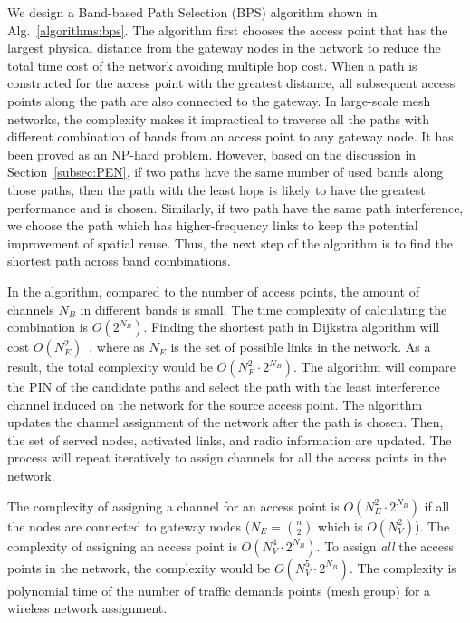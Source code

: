We design a Band-based Path Selection (BPS) algorithm shown in Alg.~\ref{algorithms:bps}. 
The algorithm first chooses the access point that has the largest physical distance from the 
gateway nodes in the network to reduce the total time cost of the network avoiding multiple hop cost. 
When a path is constructed for the access point with the greatest distance, all 
subsequent access points along the path are also connected to the gateway. 
In large-scale mesh networks, the complexity makes it impractical to traverse all the 
paths with different combination of bands from an access point to any gateway node. It has been 
proved as an NP-hard problem. However, based on the discussion in Section~\ref{subsec:PEN}, 
if two paths have the same number of used bands along those paths, then the path with the 
least hops is likely to have the greatest performance and is chosen. Similarly, if two path 
have the same path interference, we choose the path which has higher-frequency links to keep 
the potential improvement of spatial reuse. Thus, the next step of the algorithm is to find 
the shortest path across band combinations.

In the algorithm, compared to the number of access points, the amount of channels $N_B$ in
different bands is small. The time complexity of calculating the combination is $O(2^{N_B})$. 
Finding the shortest path in Dijkstra algorithm will cost $O(N_E^2)$~\cite{golden1976shortest}, 
where as $N_E$ is the set of possible links in the network. As a result, the total complexity 
would be $O(N_E^2\cdot 2^{N_B})$. 
The algorithm will compare the PIN of the candidate paths and select the path with the 
least interference channel induced on the network for the source access point.
The algorithm updates the channel assignment of the network after the path is chosen.
Then, the set of served nodes, activated links, and radio information are updated. 
The process will repeat iteratively to assign channels for all the access points in the
network.

The complexity of assigning a channel for an access point is $O(N_E^2\cdot2^{N_B})$ 
if all the nodes are connected to gateway nodes ($N_E={n \choose 2}$ which is $O(N_V^2)$). 
The complexity of assigning an access point is $O(N_V^4\cdot2^{N_B})$.
To assign {\it all} the access points in the network, the complexity would be 
$O(N_V^5\cdot2^{N_B})$. The complexity is polynomial time of the number of traffic 
demands points (mesh group) for a wireless network assignment.


